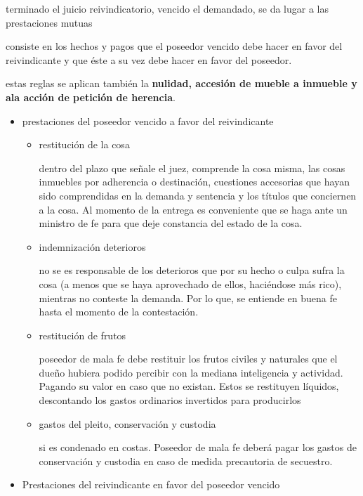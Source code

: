 \documentclass[]{article}
\providecommand{\tightlist}{%
  \setlength{\itemsep}{0pt}\setlength{\parskip}{0pt}}
\begin{document}
\begin{itemize}
\begin{itemize}
\begin{itemize}
      terminado el juicio reivindicatorio, vencido el demandado, se da
      lugar a las prestaciones mutuas

      consiste en los hechos y pagos que el poseedor vencido debe hacer
      en favor del reivindicante y que éste a su vez debe hacer en favor
      del poseedor.

      estas reglas se aplican también la \textbf{nulidad, accesión de
      mueble a inmueble y ala acción de petición de herencia}.

      \begin{itemize}
      \tightlist
      \item
        prestaciones del poseedor vencido a favor del reivindicante

        \begin{itemize}
        \item
          restitución de la cosa

          dentro del plazo que señale el juez, comprende la cosa misma,
          las cosas inmuebles por adherencia o destinación, cuestiones
          accesorias que hayan sido comprendidas en la demanda y
          sentencia y los títulos que conciernen a la cosa. Al momento
          de la entrega es conveniente que se haga ante un ministro de
          fe para que deje constancia del estado de la cosa.
        \item
          indemnización deterioros

          no se es responsable de los deterioros que por su hecho o
          culpa sufra la cosa (a menos que se haya aprovechado de ellos,
          haciéndose más rico), mientras no conteste la demanda. Por lo
          que, se entiende en buena fe hasta el momento de la
          contestación.
        \item
          restitución de frutos

          poseedor de mala fe debe restituir los frutos civiles y
          naturales que el dueño hubiera podido percibir con la mediana
          inteligencia y actividad. Pagando su valor en caso que no
          existan. Estos se restituyen líquidos, descontando los gastos
          ordinarios invertidos para producirlos
        \item
          gastos del pleito, conservación y custodia

          si es condenado en costas. Poseedor de mala fe deberá pagar
          los gastos de conservación y custodia en caso de medida
          precautoria de secuestro.
        \end{itemize}
      \item
        Prestaciones del reivindicante en favor del poseedor vencido


\end{itemize}
\end{itemize}
\end{itemize}
\end{itemize}
\end{document}
